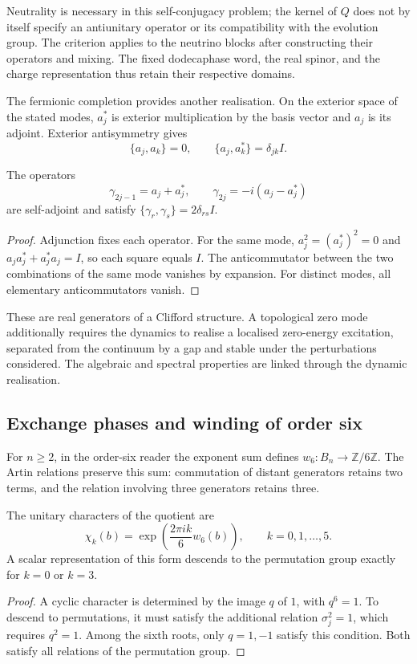 Neutrality is necessary in this self-conjugacy problem;
the kernel of $Q$ does not by itself specify an antiunitary operator
or its compatibility with the evolution group. The criterion applies to the
neutrino blocks after constructing their operators and mixing.
The fixed dodecaphase word, the real spinor, and the charge
representation thus retain their respective domains.

The fermionic completion provides another realisation. On the
exterior space of the stated modes, $a_j^*$ is exterior
multiplication by the basis vector and $a_j$ is its adjoint. Exterior
antisymmetry gives
\[
 \{a_j,a_k\}=0,\qquad \{a_j,a_k^*\}=\delta_{jk}I.
\]

\begin{proposition}
\label{vi:vi:prop:car-real}
The operators
\[
 \gamma_{2j-1}=a_j+a_j^*,\qquad
 \gamma_{2j}=-i(a_j-a_j^*)
\]
are self-adjoint and satisfy $\{\gamma_r,\gamma_s\}=2\delta_{rs}I$.
\end{proposition}
\begin{proof}
Adjunction fixes each operator. For the same mode,
$a_j^2=(a_j^*)^2=0$ and $a_ja_j^*+a_j^*a_j=I$, so each
square equals $I$. The anticommutator between the two combinations
of the same mode vanishes by expansion. For distinct modes,
all elementary anticommutators vanish.
\end{proof}

These are real generators of a Clifford structure. A topological zero
mode additionally requires the dynamics to realise a localised
zero-energy excitation, separated from the continuum by a gap and
stable under the perturbations considered. The algebraic and spectral
properties are linked through the dynamic realisation.

\subsection{Exchange phases and winding of order six}

For \(n\ge2\), in the order-six reader the exponent sum defines
$w_6:B_n\to\mathbb Z/6\mathbb Z$. The Artin relations
preserve this sum: commutation of distant generators retains
two terms, and the relation involving three generators retains three.

\begin{proposition}
\label{vi:vi:prop:devanado-seis}
The unitary characters of the quotient are
\[
 \chi_k(b)=\exp\!\left(\frac{2\pi i k}{6}w_6(b)\right),
 \qquad k=0,1,\ldots,5.
\]
A scalar representation of this form descends to the permutation
group exactly for $k=0$ or $k=3$.
\end{proposition}
\begin{proof}
A cyclic character is determined by the image $q$ of $1$,
with $q^6=1$. To descend to permutations, it must satisfy the
additional relation $\sigma_j^2=1$, which requires $q^2=1$.
Among the sixth roots, only $q=1,-1$ satisfy this condition.
Both satisfy all relations of the permutation group.
\end{proof}

